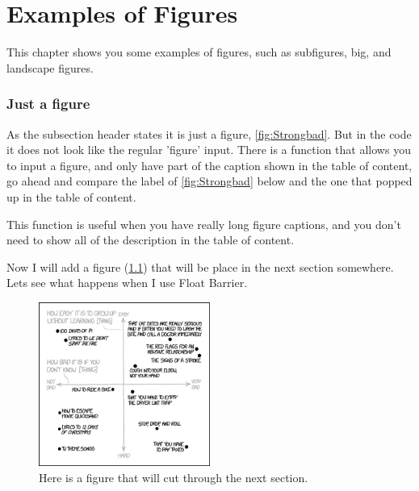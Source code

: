 \chapter{Examples of Figures}
\label{cha:important-chapter}
This chapter shows you some examples of figures, such as subfigures,  big, and landscape figures. 


\subsection{Just a figure}
As the subsection header states it is just a figure, \ref{fig:Strongbad}. But in the code it does not look like the regular 'figure' input. There is a function that allows you to input a figure, and only have part of the caption shown in the table of content, go ahead and compare the label of \ref{fig:Strongbad} below and the one that popped up in the table of content. 


This function is useful when you have really long figure captions, and you don't need to show all of the description in the table of content.

Now I will add a figure (\ref{fig:CutvsFloatBarrier}) that will be place in the next section somewhere. Lets see what happens when I use Float Barrier. 

\begin{figure}[ht]
    \centering
    \includegraphics[width = 0.5\textwidth]{figures/image-03.png}
    \caption{Here is a figure that will cut through the next section.}
    \label{fig:CutvsFloatBarrier}
\end{figure}

\FloatBarrier

